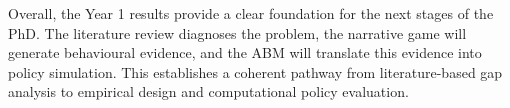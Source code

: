 \documentclass[12pt,a4paper]{report}
\begin{document}







Overall, the Year 1 results provide a clear foundation for the next stages of the PhD. The literature review diagnoses the problem, the narrative game will generate behavioural evidence, and the ABM will translate this evidence into policy simulation. This establishes a coherent pathway from literature-based gap analysis to empirical design and computational policy evaluation.
\end{document}
